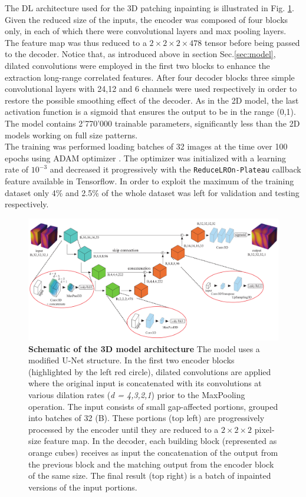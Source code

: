 The DL architecture used for the 3D patching inpainting is illustrated in Fig. \ref{fig:architecture3d}.  
Given the reduced size of the inputs, the encoder was composed of four blocks only, in each of which there
were convolutional layers and max pooling layers. The feature map was thus reduced to a $2\times2\times2\times478$ tensor 
before being passed to the decoder. Notice that, as introduced above in section Sec.\ref{sec:model},
dilated convolutions were employed in the first two blocks to enhance the extraction long-range correlated features. 
After four decoder blocks three simple convolutional layers with 24,12 and 6 channels were used respectively in 
order to restore the possible smoothing effect of the decoder. As in the 2D model, the last activation function is 
a sigmoid that ensures the output to be in the range (0,1). 
The model contains 2'770'000 trainable parameters, significantly less than the 2D models working on full size patterns. 
\\
The training was performed loading batches of 32 images at the time over 100 epochs using ADAM optimizer \cite{ADAM}. 
The optimizer was initialized with a learning rate of $10^{-3}$ and decreased it progressively with the 
\texttt{ReduceLROn-Plateau} callback feature available in Tensorflow. In order to exploit the maximum of the training 
dataset only 4\% and 2.5\% of the whole dataset was left for validation and testing respectively.  

\begin{figure}[h]
    \centering
    \includegraphics[width=\textwidth]{figures/Inpainting/Architecture_compressed.pdf}
    \caption{\textbf{Schematic of the 3D model architecture} The model uses a modified U-Net structure. 
    In the first two encoder blocks (highlighted by the left red circle), dilated convolutions are applied where the 
    original input is concatenated with its convolutions at various dilation rates (\textit{d = 4,3,2,1}) prior 
    to the MaxPooling operation. The input consists of small gap-affected portions, grouped into batches
     of 32 (B). These portions (top left) are progressively processed by the encoder until they are reduced to a 
     $ 2\times2\times2$ pixel-size feature map. In the decoder, each building block (represented as orange cubes) receives 
     as input the concatenation of the output from the previous block and the matching output from the encoder block 
     of the same size. The final result (top right) is a batch of inpainted versions of the input portions.}

    \label{fig:architecture3d}
\end{figure}

